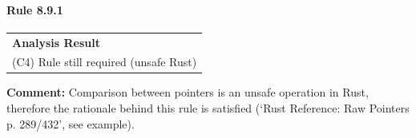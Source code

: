 \paragraph{Rule 8.9.1}
\begin{longtable}{p{13cm}}
\textbf{Analysis Result} \\
(C4) Rule still required (unsafe Rust) \\
\end{longtable}
\textbf{Comment:} Comparison between pointers is an unsafe operation in Rust, therefore the rationale behind this rule is satisfied (`Rust Reference: Raw Pointers p. 289/432', see example). \\


